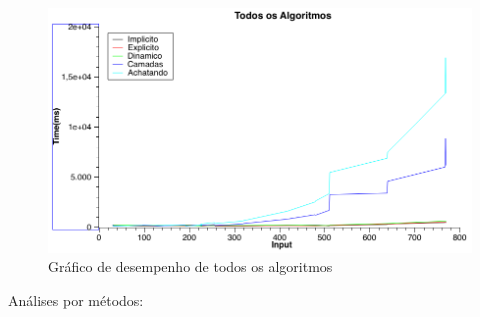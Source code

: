 \documentclass[a4paper, 10pt]{article}
\begin{document}
\newpage
\begin{figure}[!h]
\centering
\includegraphics[scale=0.35]{todos_algoritmos}
\caption{Gráfico de desempenho de todos os algoritmos}
\label{Gráfico de todos algoritmos}
\end{figure}

Análises por métodos:
\end{document}
